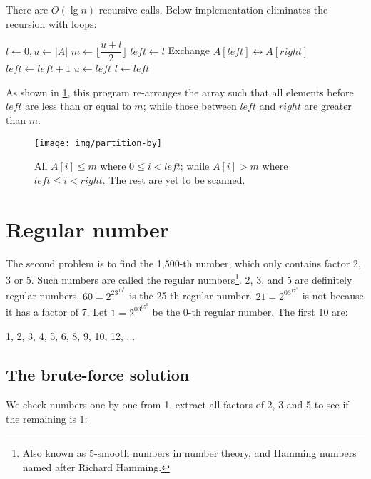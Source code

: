 \documentclass[b5paper]{article}
\begin{document}
There are $O(\lg n)$ recursive calls. Below implementation eliminates the recursion with loops:

\begin{algorithmic}[1]
  \State $l \gets 0, u \gets |A|$
    \State $m \gets \lfloor \dfrac{u + l}{2} \rfloor$
    \State $\textit{left} \gets l$
        \State Exchange $A[\textit{left}] \leftrightarrow A[right]$
        \State $\textit{left} \gets \textit{left} + 1$
      \EndIf
    \EndFor
      \State $u \gets \textit{left}$
    \Else
      \State $l \gets \textit{left}$
    \EndIf
  \EndWhile
\EndFunction
\end{algorithmic}

As shown in \cref{fig:divide}, this program re-arranges the array such that all elements before $\textit{left}$ are less than or equal to $m$; while those between $\textit{left}$ and $right$ are greater than $m$.

\begin{figure}[htbp]
  \centering
  \texttt{[image: img/partition-by]}
  \caption{All $A[i] \leq m$ where $0 \leq i < \textit{left}$; while $A[i] > m$ where $\textit{left} \leq i < right$. The rest are yet to be scanned.}
  \label{fig:divide}
\end{figure}

\section*{Regular number}

The second problem is to find the 1,500-th number, which only contains factor 2, 3 or 5. Such numbers are called the regular numbers\footnote{Also known as 5-smooth numbers in number theory, and Hamming numbers named after Richard Hamming.}. 2, 3, and 5 are definitely regular numbers. $60 = 2^23^15^1$ is the 25-th regular number. $21 = 2^03^17^1$ is not because it has a factor of 7. Let $1=2^03^05^0$ be the 0-th regular number. The first 10 are:

1, 2, 3, 4, 5, 6, 8, 9, 10, 12, ...

\subsection*{The brute-force solution}
We check numbers one by one from 1, extract all factors of 2, 3 and 5 to see if the remaining is 1:
\end{document}
